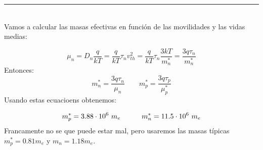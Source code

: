 \rule{\textwidth}{0.1pt} \\[2pt]

Vamos a calcular las masas efectivas en función de las movilidades y las vidas medias:

\begin{equation}
    \mu_n = D_n \frac{q}{kT} = \frac{q}{kT} \tau_n v^2_{th} = \frac{q}{kT} \tau_n \frac{3kT}{m_n^*} = \frac{3q\tau_n}{m_n^*}
\end{equation}
Entonces:
\begin{equation}
    m_n^* = \frac{3q\tau_n}{\mu_n} \qquad m_p^* = \frac{3q\tau_p}{\mu_p^*}
\end{equation}
Usando estas ecuacioens obtenemos:

\begin{equation}
    m_p^* = 3.88 \cdot 10^6 \ m_e \quad \quad \quad m_n^* = 11.5 \cdot 10^6 \ m_e
\end{equation}
Francamente no se que puede estar mal, pero usaremos las masas típicas $m_p^* = 0.81m_e$ y $m_n=1.18 m_e$. 
